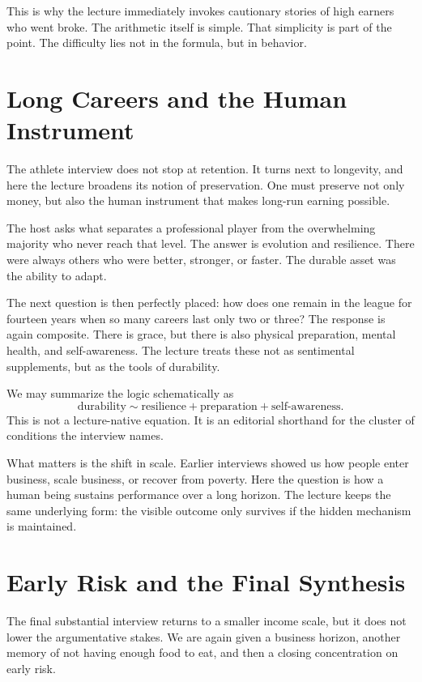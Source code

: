 This is why the lecture immediately invokes cautionary stories of high earners who went broke. The arithmetic itself is simple. That simplicity is part of the point. The difficulty lies not in the formula, but in behavior.

\section{Long Careers and the Human Instrument}

The athlete interview does not stop at retention. It turns next to longevity, and here the lecture broadens its notion of preservation. One must preserve not only money, but also the human instrument that makes long-run earning possible.

The host asks what separates a professional player from the overwhelming majority who never reach that level. The answer is evolution and resilience. There were always others who were better, stronger, or faster. The durable asset was the ability to adapt.

The next question is then perfectly placed: how does one remain in the league for fourteen years when so many careers last only two or three? The response is again composite. There is grace, but there is also physical preparation, mental health, and self-awareness. The lecture treats these not as sentimental supplements, but as the tools of durability.

We may summarize the logic schematically as
\begin{equation}
\text{durability} \sim \text{resilience} + \text{preparation} + \text{self-awareness}.
\end{equation}
This is not a lecture-native equation. It is an editorial shorthand for the cluster of conditions the interview names.

What matters is the shift in scale. Earlier interviews showed us how people enter business, scale business, or recover from poverty. Here the question is how a human being sustains performance over a long horizon. The lecture keeps the same underlying form: the visible outcome only survives if the hidden mechanism is maintained.

\section{Early Risk and the Final Synthesis}

The final substantial interview returns to a smaller income scale, but it does not lower the argumentative stakes. We are again given a business horizon, another memory of not having enough food to eat, and then a closing concentration on early risk.

